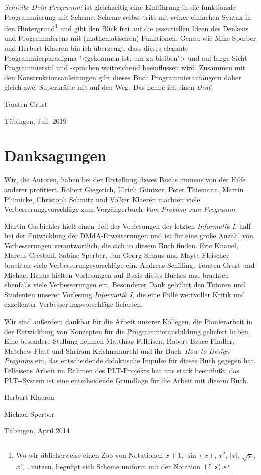 \textit{Schreibe Dein Programm!} ist gleichzeitig eine Einführung in die
funktionale Programmierung mit Scheme.  Scheme selbst tritt mit seiner
einfachen Syntax in den Hintergrund\footnote{Wo wir üblicherweise einen
Zoo von Notationen $x+1$, $\sin(x)$, $x^2$, $\vert x\vert$, $\sqrt{x}$,
$x!$, \dots nutzen, begnügt sich Scheme uniform mit der
Notation~\texttt{(f~x)}.} und gibt den Blick frei auf die essentiellen
Ideen des Denkens und Programmierens mit (mathematischen) Funktionen.
Genau wie Mike Sperber und Herbert Klaeren bin ich überzeugt, dass
dieses elegante Programmierparadigma "<gekommen ist, um zu bleiben"> und
auf lange Sicht Programmierstil und -sprachen weitreichend beeinflussen
wird.  Zusammen mit den Konstruktionsanleitungen gibt dieses Buch
Programmieranfängern daher gleich zwei Superkräfte mit auf den Weg.  Das
nenne ich einen \emph{Deal}!

\begin{flushright}
  Torsten Grust

  Tübingen, Juli~2019
\end{flushright}

\section*{Danksagungen}

Wir, die Autoren, haben bei der Erstellung dieses Buchs immens von der
Hilfe anderer profitiert.  Robert Giegerich, Ulrich Güntzer, Peter
Thiemann, Martin Plümicke, Christoph Schmitz und Volker Klaeren
machten viele Verbesserungsvorschläge zum Vorgängerbuch \textit{Vom
  Problem zum Programm}.

Martin Gasbichler hielt einen Teil der Vorlesungen der letzten
\textit{Informatik I}, half bei der Entwicklung der DMdA-Erweiterungen
und ist für eine große Anzahl von Verbesserungen verantwortlich, die
sich in diesem Buch finden.  Eric Knauel, Marcus Crestani, Sabine
Sperber, Jan-Georg Smaus und Mayte Fleischer brachten viele Verbesserungsvorschläge
ein.  Andreas Schilling, Torsten Grust und Michael Hanus hielten
Vorlesungen auf Basis dieses Buches und brachten ebenfalls viele
Verbesserungen ein.
Besonderer Dank gebührt den Tutoren und Studenten unserer Vorlesung
\textit{Informatik I}, die eine
Fülle wertvoller Kritik und exzellenter Verbesserungsvorschläge
lieferten.

Wir sind außerdem dankbar für die Arbeit unserer Kollegen, die
Pionierarbeit in der Entwicklung von Konzepten für die
Programmierausbildung geliefert haben.  Eine besondere
Stellung nehmen Matthias Felleisen, Robert Bruce Findler, Matthew
Flatt und Shriram Krishnamurthi und ihr Buch~\textit{How to Design
  Programs} \cite{FelleisenFindlerFlattKrishnamurthi2001} ein, das
entscheidende didaktische Impulse für dieses Buch gegegen hat.
Felleisens Arbeit im Rahmen des PLT-Projekts hat uns stark beeinflußt;
das PLT-\drscheme{}-System ist eine entscheidende Grundlage für die
Arbeit mit diesem Buch.

\begin{flushright}
  Herbert Klaeren

  Michael Sperber

  Tübingen, April 2014
\end{flushright}


\newpage

\thispagestyle{empty}


